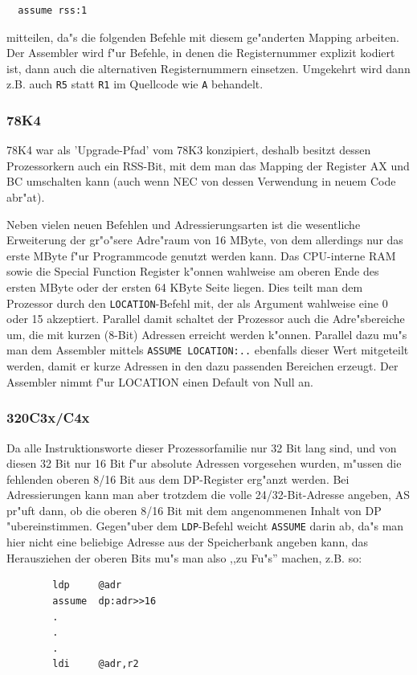 \documentclass[12pt,a4paper,twoside]{report}
\newcommand{\tty}[1]{{\tt #1}}
\newcommand{\asname}{AS}
\begin{document}
\begin{verbatim}
  assume rss:1
\end{verbatim}

mitteilen, da"s die folgenden Befehle mit diesem ge"anderten Mapping arbeiten.  Der
Assembler wird f"ur Befehle, in denen die Registernummer explizit kodiert ist, dann
auch die alternativen Registernummern einsetzen.  Umgekehrt wird dann z.B. auch
\tty{R5} statt \tty{R1} im Quellcode wie \tty{A} behandelt.


\subsubsection{78K4}

78K4 war als 'Upgrade-Pfad' vom 78K3 konzipiert, deshalb besitzt
dessen Prozessorkern auch ein RSS-Bit, mit dem man das Mapping
der Register AX und BC umschalten kann (auch wenn NEC von dessen
Verwendung in neuem Code abr"at).

Neben vielen neuen Befehlen und Adressierungsarten ist die
wesentliche Erweiterung der gr"o"sere Adre"raum von 16 MByte, von
dem allerdings nur das erste MByte f"ur Programmcode genutzt
werden kann.  Das CPU-interne RAM sowie die Special Function
Register k"onnen wahlweise am oberen Ende des ersten MByte oder
der ersten 64 KByte Seite liegen.  Dies teilt man dem Prozessor
durch den \tty{LOCATION}-Befehl mit, der als Argument wahlweise
eine 0 oder 15 akzeptiert.  Parallel damit schaltet der Prozessor
auch die Adre"sbereiche um, die mit kurzen (8-Bit) Adressen
erreicht werden k"onnen.  Parallel dazu mu"s man dem Assembler
mittels \tty{ASSUME LOCATION:..} ebenfalls dieser Wert mitgeteilt
werden, damit er kurze Adressen in den dazu passenden Bereichen
erzeugt.  Der Assembler nimmt f"ur LOCATION einen Default von Null
an.


\subsubsection{320C3x/C4x}

Da alle Instruktionsworte dieser Prozessorfamilie nur 32 Bit lang
sind, und von diesen 32 Bit nur 16 Bit f"ur absolute Adressen vorgesehen
wurden, m"ussen die fehlenden oberen 8/16 Bit aus dem DP-Register
erg"anzt werden.  Bei Adressierungen kann man aber trotzdem die volle
24/32-Bit-Adresse angeben, \asname{} pr"uft dann, ob die oberen 8/16 Bit mit dem
angenommenen Inhalt von DP "ubereinstimmen.  Gegen"uber dem \tty{LDP}-Befehl
weicht \tty{ASSUME} darin ab, da"s man hier nicht eine beliebige Adresse
aus der Speicherbank angeben kann, das Herausziehen der oberen Bits
mu"s man also ,,zu Fu"s'' machen, z.B. so:
\begin{verbatim}
        ldp     @adr
        assume  dp:adr>>16
        .
        .
        .
        ldi     @adr,r2
\end{verbatim}
\end{document}
